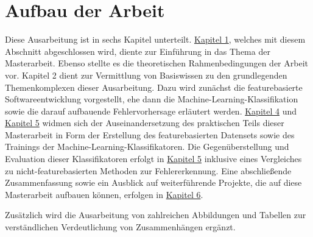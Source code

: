 \section{Aufbau der Arbeit}

Diese Ausarbeitung ist in sechs Kapitel unterteilt. \hyperref[introduction]{Kapitel 1}, welches mit diesem Abschnitt abgeschlossen wird, diente zur Einführung in das Thema der Masterarbeit. Ebenso stellte es die theoretischen Rahmenbedingungen der Arbeit vor. Kapitel 2 dient zur Vermittlung von Basiswissen zu den grundlegenden Themenkomplexen dieser Ausarbeitung. Dazu wird zunächst die featurebasierte Softwareentwicklung vorgestellt, ehe dann die Machine-Learning-Klassifikation sowie die darauf aufbauende Fehlervorhersage erläutert werden. \hyperref[dataset]{Kapitel 4} und \hyperref[training]{Kapitel 5} widmen sich der Auseinandersetzung des praktischen Teils dieser Masterarbeit in Form der Erstellung des featurebasierten Datensets sowie des Trainings der Machine-Learning-Klassifikatoren. Die Gegenüberstellung und Evaluation dieser Klassifikatoren erfolgt in \hyperref[evaluation]{Kapitel 5} inklusive eines Vergleiches zu nicht-featurebasierten Methoden zur Fehlererkennung. Eine abschließende Zusammenfassung sowie ein Ausblick auf weiterführende Projekte, die auf diese Masterarbeit aufbauen können, erfolgen in \hyperref[conclusion]{Kapitel 6}.

Zusätzlich wird die Ausarbeitung von zahlreichen Abbildungen und Tabellen zur verständlichen Verdeutlichung von Zusammenhängen ergänzt.

\cleardoublepage
